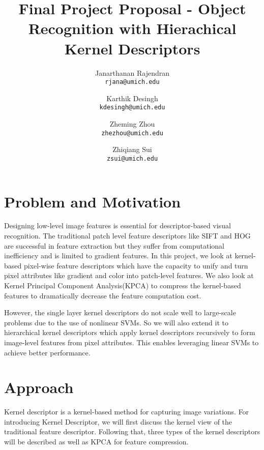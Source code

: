 \documentclass[10pt,twocolumn,letterpaper]{article}
\begin{document}
\title{Final Project Proposal - Object Recognition with Hierachical Kernel Descriptors}

\author{Janarthanan Rajendran\\
{\tt\small rjana@umich.edu}
\and
Karthik Desingh\\
{\tt\small kdesingh@umich.edu}
\and
Zheming Zhou\\
{\tt\small zhezhou@umich.edu}
\and
Zhiqiang Sui\\
{\tt\small zsui@umich.edu}
}
\maketitle

\section{Problem and Motivation}
Designing low-level image features is essential for descriptor-based visual recognition. The traditional patch level feature descriptors like SIFT\cite{lowe2004distinctive} and HOG\cite{dalal2005histograms} are successful in feature extraction but they suffer from computational inefficiency and is limited to gradient features. In this project, we look at kernel-based pixel-wise feature descriptors\cite{bo_nips10} which have the capacity to unify and turn pixel attributes like gradient and color into patch-level features. We also look at Kernel Principal Component Analysis(KPCA)\cite{scholkopf1998nonlinear} to compress the kernel-based features to dramatically decrease the feature computation cost.

However, the single layer kernel descriptors do not scale well to large-scale problems due to the use of nonlinear SVMs. So we will also extend it to hierarchical kernel descriptors \cite{bo_cvpr11} which apply kernel descriptors recursively to form image-level features from pixel attributes. This enables leveraging linear SVMs to achieve better performance.  
\section{Approach}
Kernel descriptor\cite{bo_nips10} is a kernel-based method for capturing image variations. For introducing Kernel Descriptor, we will first discuss the kernel view of the traditional feature descriptor. Following that, three types of the kernel descriptors will be described as well as KPCA for feature compression.
\end{document}
